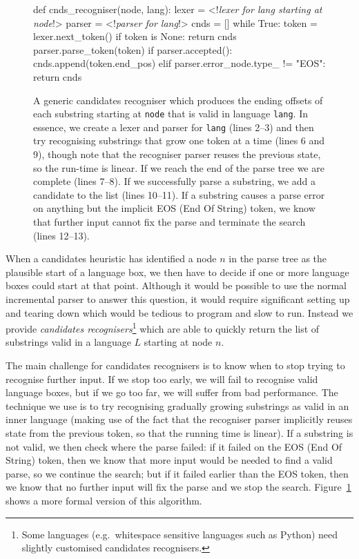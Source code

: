\documentclass[sigplan,screen]{acmart}\settopmatter{printfolios=true,printccs=false,printacmref=false}
\begin{document}
\begin{figure}
\begin{lstdefault}[]
def cnds_recogniser(node, lang):
  lexer = <!\textrm{\textit{lexer for lang starting at node}}!>
  parser = <!\textrm{\textit{parser for lang}}!>
  cnds = []
  while True:
    token = lexer.next_token()
    if token is None:
      return cnds
    parser.parse_token(token)
    if parser.accepted():
      cnds.append(token.end_pos)
    elif parser.error_node.type_ != "EOS":
        return cnds
\end{lstdefault}
\caption{A generic candidates recogniser which produces the ending offsets of
  each substring starting at \texttt{node} that is valid in language
  \texttt{lang}. In essence, we create a lexer and parser for \texttt{lang}
  (lines 2--3) and then try recognising substrings that grow one token at a
  time (lines 6 and 9), though note that the recogniser parser reuses the previous
  state, so the run-time is linear. If we reach the end of the parse tree we are complete
  (lines 7--8). If we successfully parse a substring, we add a candidate to the
  list (lines 10--11). If a substring causes a parse error on anything but the
  implicit EOS (End Of String) token, we know that further input cannot fix the parse
    and terminate the search (lines 12--13).}
\label{fig:recogniser}
\end{figure}

When a candidates heuristic has identified a node $n$ in the parse tree as the
plausible start of a language box, we then have to decide if one or more
language boxes could start at that point. Although it would be possible to use
the normal incremental parser to answer this question, it would require
significant setting up and tearing down which would be tedious to program and
slow to run. Instead we provide \emph{candidates recognisers}\footnote{Some languages
  (e.g.~whitespace sensitive languages such as Python) need slightly customised
candidates recognisers.} which are able to quickly return the list of substrings valid in
a language $L$ starting at node $n$.

The main challenge for candidates recognisers is to know when to stop trying to recognise
further input. If we stop too early, we will fail to recognise valid language
boxes, but if we go too far, we will suffer from bad performance. The technique
we use is to try recognising gradually growing substrings as valid in an inner
language (making use of the fact that the recogniser parser implicitly
reuses state from the previous token, so that the running time is linear).
If a substring is not valid, we then check where the parse failed:
if it failed on the EOS (End Of String) token, then we know that more input
would be needed to find a valid parse, so we continue the search; but if it
failed earlier than the EOS token, then we know that no further input will
fix the parse and we stop the search. Figure~\ref{fig:recogniser} shows a
more formal version of this algorithm.
\end{document}
